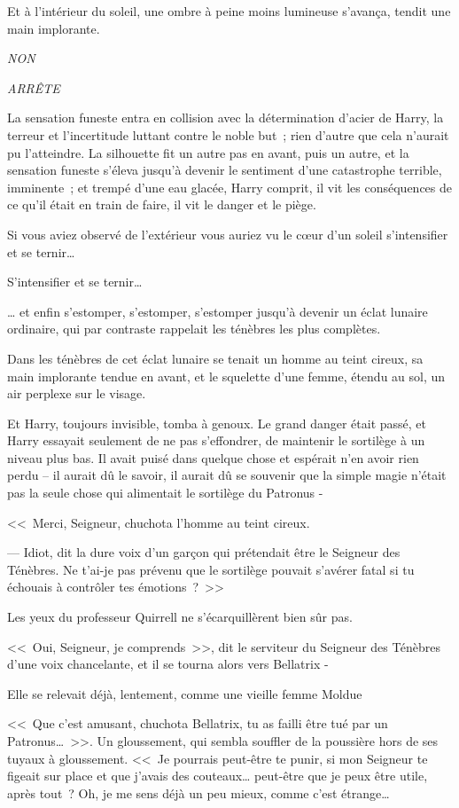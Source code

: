 Et à l'intérieur du soleil, une ombre à peine moins lumineuse s'avança, tendit une main implorante.

\emph{NON}

\emph{ARRÊTE}

La sensation funeste entra en collision avec la détermination d'acier de Harry, la terreur et l'incertitude luttant contre le noble but~; rien d'autre que cela n'aurait pu l'atteindre. La silhouette fit un autre pas en avant, puis un autre, et la sensation funeste s'éleva jusqu'à devenir le sentiment d'une catastrophe terrible, imminente~; et trempé d'une eau glacée, Harry comprit, il vit les conséquences de ce qu'il était en train de faire, il vit le danger et le piège.

Si vous aviez observé de l'extérieur vous auriez vu le cœur d'un soleil s'intensifier et se ternir…

S'intensifier et se ternir…

… et enfin s'estomper, s'estomper, s'estomper jusqu'à devenir un éclat lunaire ordinaire, qui par contraste rappelait les ténèbres les plus complètes.

Dans les ténèbres de cet éclat lunaire se tenait un homme au teint cireux, sa main implorante tendue en avant, et le squelette d'une femme, étendu au sol, un air perplexe sur le visage.

Et Harry, toujours invisible, tomba à genoux. Le grand danger était passé, et Harry essayait seulement de ne pas s'effondrer, de maintenir le sortilège à un niveau plus bas. Il avait puisé dans quelque chose et espérait n'en avoir rien perdu -- il aurait dû le savoir, il aurait dû se souvenir que la simple magie n'était pas la seule chose qui alimentait le sortilège du Patronus -

<<~Merci, Seigneur, chuchota l'homme au teint cireux.

--- Idiot, dit la dure voix d'un garçon qui prétendait être le Seigneur des Ténèbres. Ne t'ai-je pas prévenu que le sortilège pouvait s'avérer fatal si tu échouais à contrôler tes émotions~?~>>

Les yeux du professeur Quirrell ne s'écarquillèrent bien sûr pas.

<<~Oui, Seigneur, je comprends~>>, dit le serviteur du Seigneur des Ténèbres d'une voix chancelante, et il se tourna alors vers Bellatrix -

Elle se relevait déjà, lentement, comme une vieille femme Moldue

 <<~Que c'est amusant, chuchota Bellatrix, tu as failli être tué par un Patronus…~>>. Un gloussement, qui sembla souffler de la poussière hors de ses tuyaux à gloussement. <<~Je pourrais peut-être te punir, si mon Seigneur te figeait sur place et que j'avais des couteaux… peut-être que je peux être utile, après tout~? Oh, je me sens déjà un peu mieux, comme c'est étrange…

